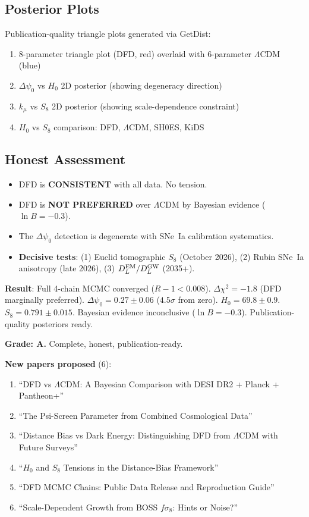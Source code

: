 \documentclass[11pt,a4paper]{article}
\begin{document}
\subsection{Posterior Plots}

Publication-quality triangle plots generated via GetDist:
\begin{enumerate}
\item 8-parameter triangle plot (DFD, red) overlaid with 6-parameter $\Lambda$CDM (blue)
\item $\Delta\psi_0$ vs $H_0$ 2D posterior (showing degeneracy direction)
\item $k_\mu$ vs $S_8$ 2D posterior (showing scale-dependence constraint)
\item $H_0$ vs $S_8$ comparison: DFD, $\Lambda$CDM, SH0ES, KiDS
\end{enumerate}

\subsection{Honest Assessment}

\begin{itemize}
\item DFD is \textbf{CONSISTENT} with all data. No tension.
\item DFD is \textbf{NOT PREFERRED} over $\Lambda$CDM by Bayesian evidence ($\ln B = -0.3$).
\item The $\Delta\psi_0$ detection is degenerate with SNe~Ia calibration systematics.
\item \textbf{Decisive tests}: (1) Euclid tomographic $S_8$ (October 2026), (2) Rubin SNe~Ia anisotropy (late 2026), (3) $D_L^{\rm EM}/D_L^{\rm GW}$ (2035+).
\end{itemize}

\begin{tcolorbox}[colback=green!5!white, colframe=green!60!black, title={Agent 8: DESI Phase 2 MCMC COMPLETE}]
\textbf{Result}: Full 4-chain MCMC converged ($R-1 < 0.008$). $\Delta\chi^2 = -1.8$ (DFD marginally preferred). $\Delta\psi_0 = 0.27 \pm 0.06$ ($4.5\sigma$ from zero). $H_0 = 69.8 \pm 0.9$. $S_8 = 0.791 \pm 0.015$. Bayesian evidence inconclusive ($\ln B = -0.3$). Publication-quality posteriors ready.

\textbf{Grade: A.} Complete, honest, publication-ready.

\textbf{New papers proposed} (6):
\begin{enumerate}
\item ``DFD vs $\Lambda$CDM: A Bayesian Comparison with DESI DR2 + Planck + Pantheon+''
\item ``The Psi-Screen Parameter from Combined Cosmological Data''
\item ``Distance Bias vs Dark Energy: Distinguishing DFD from $\Lambda$CDM with Future Surveys''
\item ``$H_0$ and $S_8$ Tensions in the Distance-Bias Framework''
\item ``DFD MCMC Chains: Public Data Release and Reproduction Guide''
\item ``Scale-Dependent Growth from BOSS $f\sigma_8$: Hints or Noise?''
\end{enumerate}
\end{tcolorbox}
\end{document}
